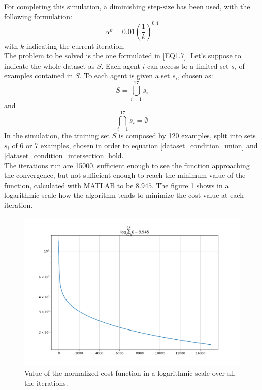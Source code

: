 \documentclass[a4paper,11pt,oneside]{book}
\begin{document}
For completing this simulation, a diminishing step-size has been used, with the following formulation:
\begin{equation}
	\alpha^k = 0.01 \left( \dfrac{1}{k} \right) ^{0.4}
\end{equation}
with $k$ indicating the current iteration.\\
The problem to be solved is the one formulated in \ref{EQ1.7}. Let's suppose to indicate the whole dataset as $S$. Each agent $i$ can access to a limited set $s_i$ of examples contained in $S$. To each agent is given a set $s_i$, chosen as:
\begin{equation}
	\label{dataset_condition_union}
	S = \bigcup\limits_{i=1}^{17} s_i
\end{equation}
and 
\begin{equation}
\label{dataset_condition_intersection}
\bigcap\limits_{i=1}^{17} s_i = \emptyset
\end{equation}
In the simulation, the training set $S$ is composed by 120 examples, split into sets $s_i$ of 6 or 7 examples, chosen in order to equation \ref{dataset_condition_union} and \ref{dataset_condition_intersection} hold.  \\
The iterations run are 15000, sufficient enough to see the function approaching the convergence, but not sufficient enough to reach the minimum value of the function, calculated with MATLAB to be $8.945$. The figure \ref{log_cost} shows in a logarithmic scale how the algorithm tends to minimize the cost value at each iteration. \\
\begin{figure}[hb]
	\centering
	\includegraphics[scale=0.4]{figs/cost_log_scale}
	\caption{Value of the normalized cost function in a logarithmic scale over all the iterations. }
	\label{log_cost}
\end{figure}
\end{document}
